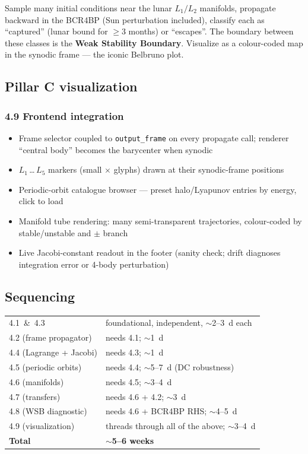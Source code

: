 \documentclass[11pt, a4paper]{article}
\begin{document}
Sample many initial conditions near the lunar $L_1/L_2$ manifolds, propagate
backward in the BCR4BP (Sun perturbation included), classify each as
``captured'' (lunar bound for $\ge 3$ months) or ``escapes''. The boundary
between these classes is the \textbf{Weak Stability Boundary}.  Visualize as
a colour-coded map in the synodic frame --- the iconic Belbruno plot.

\subsection{Pillar C visualization}

\subsubsection{4.9 Frontend integration}

\begin{itemize}[leftmargin=*]
  \item Frame selector coupled to \texttt{output\_frame} on every propagate
        call; renderer ``central body'' becomes the barycenter when synodic
  \item $L_1$\,\dots\,$L_5$ markers (small $\times$ glyphs) drawn at their
        synodic-frame positions
  \item Periodic-orbit catalogue browser --- preset halo/Lyapunov entries
        by energy, click to load
  \item Manifold tube rendering: many semi-transparent trajectories,
        colour-coded by stable/unstable and $\pm$ branch
  \item Live Jacobi-constant readout in the footer (sanity check; drift
        diagnoses integration error or 4-body perturbation)
\end{itemize}

\subsection{Sequencing}

\begin{center}
\begin{tabular}{ll}
  \toprule
  4.1 \,\&\, 4.3 & foundational, independent, $\sim$2--3~d each \\
  4.2 (frame propagator) & needs 4.1; $\sim$1~d \\
  4.4 (Lagrange + Jacobi) & needs 4.3; $\sim$1~d \\
  4.5 (periodic orbits) & needs 4.4; $\sim$5--7~d (DC robustness) \\
  4.6 (manifolds) & needs 4.5; $\sim$3--4~d \\
  4.7 (transfers) & needs 4.6 + 4.2; $\sim$3~d \\
  4.8 (WSB diagnostic) & needs 4.6 + BCR4BP RHS; $\sim$4--5~d \\
  4.9 (visualization) & threads through all of the above; $\sim$3--4~d \\
  \midrule
  \textbf{Total} & \textbf{$\sim$5--6 weeks} \\
  \bottomrule
\end{tabular}
\end{center}
\end{document}
